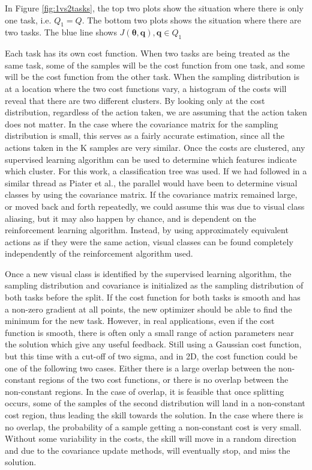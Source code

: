 \documentclass[12pt]{article}
\newcommand{\taskp}{\mathbf{q}}
\newcommand{\costf}{J}
\newcommand{\act}{\bm{\theta}}
\newcommand{\taskpsp}{Q}
\begin{document}
In Figure \ref{fig:1vs2tasks}, the top two plots show the situation where there is only one task, i.e. $\taskpsp_1 = \taskpsp$. The bottom two plots shows the situation where there are two tasks. The blue line shows $\costf(\act,\taskp), \taskp \in \taskpsp_1$

\color{red}Each task has its own cost function. When two tasks are being treated as the same task, some of the samples will be the cost function from one task, and some will be the cost function from the other task. \color{black} When the sampling distribution is at a location where the two cost functions vary, a histogram of the costs will reveal that there are two different clusters. By looking only at the cost distribution, regardless of the action taken, we are assuming that the action taken does not matter. In the case where the covariance matrix for the sampling distribution is small, this serves as a fairly accurate estimation, since all the actions taken in the K samples are very similar. Once the costs are clustered, any supervised learning algorithm can be used to determine which features indicate which cluster. For this work, a classification tree was used. If we had followed in a similar thread as Piater et al., the parallel would have been to determine visual classes by using the covariance matrix. If the covariance matrix remained large, or moved back and forth repeatedly, we could assume this was due to visual class aliasing, but it may also happen by chance, and is dependent on the reinforcement learning algorithm. Instead, by using approximately equivalent actions as if they were the same action, visual classes can be found completely independently of the reinforcement algorithm used. 

Once a new visual class is identified by the supervised learning algorithm, the sampling distribution and covariance is initialized as the sampling distribution of both tasks before the split. If the cost function for both tasks is smooth and has a non-zero gradient at all points, the new optimizer should be able to find the minimum for the new task. However, in real applications, even if the cost function is smooth, there is often only a small range of action parameters near the solution which give any useful feedback. Still using a Gaussian cost function, but this time with a cut-off of two sigma, and in 2D, the cost function could be one of the following two cases. Either there is a large overlap between the non-constant regions of the two cost functions, or there is no overlap between the non-constant regions. In the case of overlap, it is feasible that once splitting occurs, some of the samples of the second distribution will land in a non-constant cost region, thus leading the skill towards the solution. In the case where there is no overlap, the probability of a sample getting a non-constant cost is very small. Without some variability in the costs, the skill will move in a random direction and due to the covariance update methods, will eventually stop, and miss the solution.
 
\end{document}
